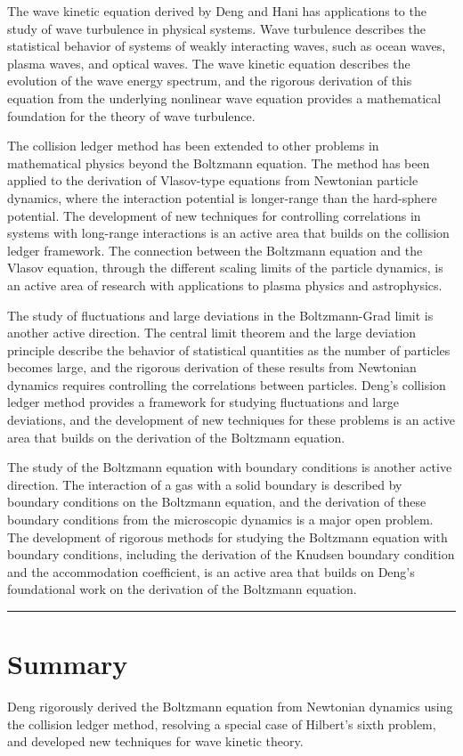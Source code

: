 The wave kinetic equation derived by Deng and Hani has applications to the study of wave turbulence in physical systems. Wave turbulence describes the statistical behavior of systems of weakly interacting waves, such as ocean waves, plasma waves, and optical waves. The wave kinetic equation describes the evolution of the wave energy spectrum, and the rigorous derivation of this equation from the underlying nonlinear wave equation provides a mathematical foundation for the theory of wave turbulence.

The collision ledger method has been extended to other problems in mathematical physics beyond the Boltzmann equation. The method has been applied to the derivation of Vlasov-type equations from Newtonian particle dynamics, where the interaction potential is longer-range than the hard-sphere potential. The development of new techniques for controlling correlations in systems with long-range interactions is an active area that builds on the collision ledger framework. The connection between the Boltzmann equation and the Vlasov equation, through the different scaling limits of the particle dynamics, is an active area of research with applications to plasma physics and astrophysics.

The study of fluctuations and large deviations in the Boltzmann-Grad limit is another active direction. The central limit theorem and the large deviation principle describe the behavior of statistical quantities as the number of particles becomes large, and the rigorous derivation of these results from Newtonian dynamics requires controlling the correlations between particles. Deng's collision ledger method provides a framework for studying fluctuations and large deviations, and the development of new techniques for these problems is an active area that builds on the derivation of the Boltzmann equation.

The study of the Boltzmann equation with boundary conditions is another active direction. The interaction of a gas with a solid boundary is described by boundary conditions on the Boltzmann equation, and the derivation of these boundary conditions from the microscopic dynamics is a major open problem. The development of rigorous methods for studying the Boltzmann equation with boundary conditions, including the derivation of the Knudsen boundary condition and the accommodation coefficient, is an active area that builds on Deng's foundational work on the derivation of the Boltzmann equation.

\begin{center}\rule{0.5\linewidth}{0.5pt}\end{center}

\section*{Summary}

Deng rigorously derived the Boltzmann equation from Newtonian dynamics using the collision ledger method, resolving a special case of Hilbert's sixth problem, and developed new techniques for wave kinetic theory.
